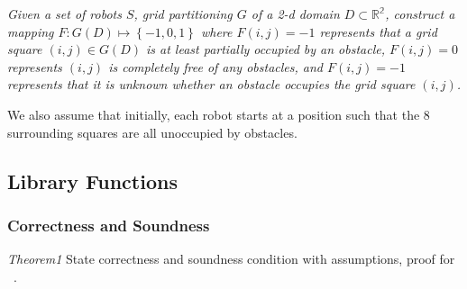 \begin{center}
\emph{
 Given a set of robots $S$, grid partitioning $G$ of a 2-d domain $D\subset \mathbb{R^2}$, construct a mapping $F: G(D) \mapsto \left\{-1,0,1\right\}$ where $F(i,j) = -1$ represents that a grid square $(i,j)\in G(D)$ is at least partially occupied by an obstacle, $F(i,j) =0$ represents $(i,j)$ is completely free of any obstacles, and $F(i,j) = -1$ represents that it is unknown whether an obstacle occupies the grid square $(i,j)$.} 
\end{center}
We also assume that initially, each robot starts at a position such that the 8 surrounding squares are all unoccupied by obstacles. 


\subsection{Library Functions}


\subsubsection{Correctness and Soundness}
\emph{Theorem1} State correctness and soundness condition with assumptions, proof for ~. 


